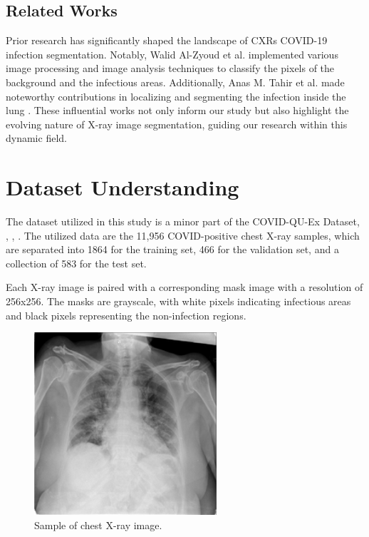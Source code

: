 \documentclass[]{acmsiggraph}
\begin{document}
\subsection{Related Works}
Prior research has significantly shaped the landscape of CXRs COVID-19 infection segmentation. Notably, Walid Al-Zyoud et al. \cite{walid2023} implemented various image processing and image analysis techniques to classify the pixels of the background and the infectious areas. Additionally, Anas M. Tahir et al. made noteworthy contributions in localizing and segmenting the infection inside the lung \cite{anas2021}. These influential works not only inform our study but also highlight the evolving nature of X-ray image segmentation, guiding our research within this dynamic field.

\section{Dataset Understanding}
The dataset utilized in this study is a minor part of the COVID-QU-Ex Dataset\cite{chowhury2020}, \cite{degerli2021}, \cite{rahman2021}, \cite{anas2021}. The utilized data are the 11,956 COVID-positive chest X-ray samples, which are separated into 1864 for the training set, 466 for the validation set, and a collection of 583 for the test set. 

Each X-ray image is paired with a corresponding mask image with a resolution of 256x256. The masks are grayscale, with white pixels indicating infectious areas and black pixels representing the non-infection regions.

\begin{figure}[h]\centering
 \includegraphics[width=0.75\linewidth]{images/covid_1.png}
 \caption{\label{fig:reference}Sample of chest X-ray image.}
\end{figure}
\end{document}
